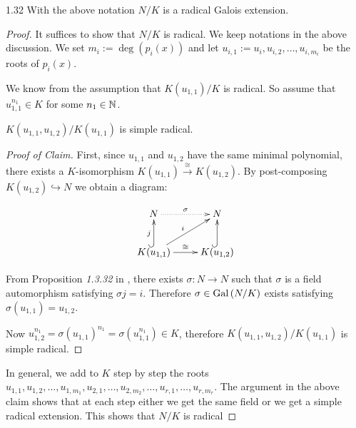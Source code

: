 \documentclass[twoside = false,	%
		headsepline,		%
		parskip = true,
		]{scrbook}						%
\begin{document}
    \begin{lemma}{}{1.32}
        With the above notation $N/K$ is a radical Galois extension.
    \end{lemma}
    
    \begin{proof}
        It suffices to show that $N/K$ is radical. We keep notations in the above discussion. We set $m_i:=\deg\left(p_i(x)\right)$ and let $u_{i,1} := u_i, u_{i,2},\dots, u_{i,m_i}$ be the roots of $p_i(x)$.
        
        We know from the assumption that $K(u_{1,1})/K$ is radical. So assume that $u_{1,1}^{n_1} \in K$ for some $n_1 \in \mathbb N$.
        
        \begin{claim*}{}{}
            $K(u_{1,1} ,u_{1,2})/K(u_{1,1})$ is simple radical.
        \end{claim*}
        \begin{proof}[Proof of Claim]
            First, since $u_{1,1}$ and $u_{1,2}$ have the same minimal polynomial, there exists a $K$-isomorphism $K(u_{1,1}) \overset{\cong}{\rightarrow} K(u_{1,2})$. By post-composing $K(u_{1,2}) \hookrightarrow N$ we obtain a diagram:
            
            \begin{equation*}
                \xymatrix{
                    N \ar@{.>}[r]^{\sigma} & N \\
                    K(u_{1,1})\ar@{^{(}->}^{j}[u] \ar^{\cong}[r]\ar^{i}[ur] & K(u_{1,2})\ar@{^{(}->}[u]
                }
            \end{equation*}
            
            From Proposition \textit{1.3.32} in \cite{Cobra}, there exists $\sigma: N \rightarrow N$ such that $\sigma$ is a field automorphism satisfying $\sigma j = i$. Therefore $\sigma \in \mathrm{Gal}\left( N/K\right)$ exists satisfying $\sigma(u_{1,1}) = u_{1,2}$.
            
            Now $u_{1,2}^{n_1} = \sigma(u_{1,1})^{n_1} = \sigma(u_{1,1}^{n_1}) \in K$, therefore $K(u_{1,1},u_{1,2})/K(u_{1,1})$ is simple radical.
        \end{proof}
        In general, we add to $K$ step by step the roots $u_{1,1},u_{1,2},\dots,u_{1,m_1},u_{2,1},\dots,u_{2,m_2}, \dots, u_{r,1}, \dots, u_{r,m_r}$. The argument in the above claim shows that at each step either we get the same field or we get a simple radical extension. This shows that $N/K$ is radical
    \end{proof}
    
\end{document}
